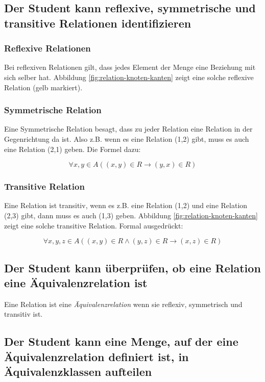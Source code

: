 \subsection{Der Student kann reflexive, symmetrische und transitive Relationen identifizieren}

\subsubsection{Reflexive Relationen}
Bei reflexiven Relationen gilt, dass jedes Element der Menge eine Beziehung mit sich selber hat. Abbildung \ref{fig:relation-knoten-kanten} zeigt eine solche reflexive Relation (gelb markiert).

\subsubsection{Symmetrische Relation}
Eine Symmetrische Relation besagt, dass zu jeder Relation eine Relation in der Gegenrichtung da ist. Also z.B. wenn es eine Relation (1,2) gibt, muss es auch eine Relation (2,1) geben. Die Formel dazu:

\begin{equation*}
    \forall x,y \in A ((x,y) \in R \to (y,x) \in R)
\end{equation*}

\subsubsection{Transitive Relation}
Eine Relation ist transitiv, wenn es z.B. eine Relation (1,2) und eine Relation (2,3) gibt, dann muss es auch (1,3) geben. Abbildung \ref{fig:relation-knoten-kanten} zeigt eine solche transitive Relation. Formal ausgedrückt:

\begin{equation*}
  \forall x,y,z \in A ((x,y) \in R \wedge (y,z) \in R \to (x,z) \in R)
\end{equation*}


\subsection{Der Student kann überprüfen, ob eine Relation eine Äquivalenzrelation ist}
Eine Relation ist eine \emph{Äquivalenzrelation} wenn sie reflexiv, symmetrisch und transitiv ist.

\subsection{Der Student kann eine Menge, auf der eine Äquivalenzrelation definiert ist, in Äquivalenzklassen aufteilen}

